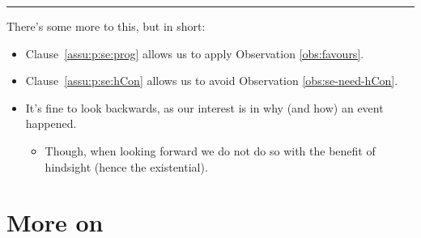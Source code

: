 \documentclass[10pt]{article}
\newcommand\lLine{{\color{gray} \noindent\rule{\textwidth}{0.4pt}}}
\newcommand{\hand}{\ding{43}}
\begin{document}
\begin{comment}
  Split perspective.
  Important.
  Weak assumption about events in progress.
  Only that there is some possible event.
  With hindsight, fix the particular event which happened.
\end{comment}

\lLine

\begin{note}
  There's some more to this, but in short:

  \begin{itemize}
  \item
    Clause~\ref{assu:p:se:prog} allows us to apply Observation \ref{obs:favours}.
  \item
    Clause~\ref{assu:p:se:hCon} allows us to avoid Observation \ref{obs:se-need-hCon}.
  \end{itemize}

  \begin{itemize}
  \item[\hand]
    It's fine to look backwards, as our interest is in why (and how) an event happened.
    \begin{itemize}
    \item
      Though, when looking forward we do not do so with the benefit of hindsight (hence the existential).
    \end{itemize}
  \end{itemize}
\end{note}

\vfill


\newpage

\section{More on }
\end{document}
